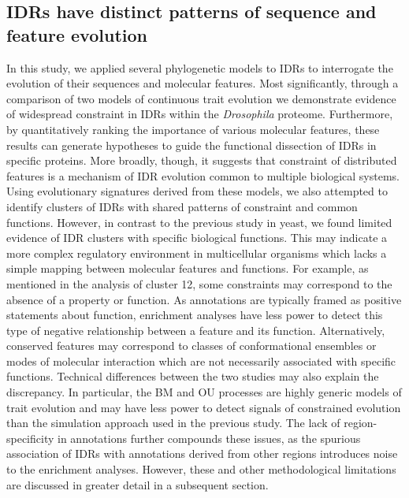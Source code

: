 \subsection{IDRs have distinct patterns of sequence and feature evolution}
In this study, we applied several phylogenetic models to IDRs to interrogate the evolution of their sequences and molecular features. Most significantly, through a comparison of two models of continuous trait evolution we demonstrate evidence of widespread constraint in IDRs within the \textit{Drosophila} proteome. Furthermore, by quantitatively ranking the importance of various molecular features, these results can generate hypotheses to guide the functional dissection of IDRs in specific proteins. More broadly, though, it suggests that constraint of distributed features is a mechanism of IDR evolution common to multiple biological systems. Using evolutionary signatures derived from these models, we also attempted to identify clusters of IDRs with shared patterns of constraint and common functions. However, in contrast to the previous study in yeast, we found limited evidence of IDR clusters with specific biological functions. This may indicate a more complex regulatory environment in multicellular organisms which lacks a simple mapping between molecular features and functions. For example, as mentioned in the analysis of cluster 12, some constraints may correspond to the absence of a property or function. As annotations are typically framed as positive statements about function, enrichment analyses have less power to detect this type of negative relationship between a feature and its function. Alternatively, conserved features may correspond to classes of conformational ensembles or modes of molecular interaction which are not necessarily associated with specific functions. Technical differences between the two studies may also explain the discrepancy. In particular, the BM and OU processes are highly generic models of trait evolution and may have less power to detect signals of constrained evolution than the simulation approach used in the previous study. The lack of region-specificity in annotations further compounds these issues, as the spurious association of IDRs with annotations derived from other regions introduces noise to the enrichment analyses. However, these and other methodological limitations are discussed in greater detail in a subsequent section.

